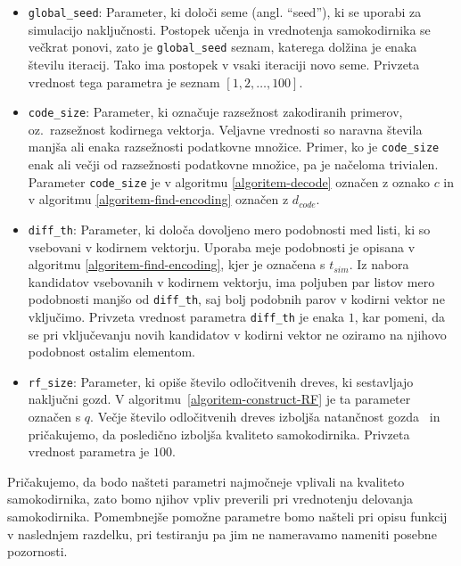 \documentclass[12pt,a4paper,twoside]{article}
\theoremstyle{definition} %
\theoremstyle{plain} %
\numberwithin{equation}{section}  %
\begin{document}
\begin{itemize}
	\item \texttt{global\_seed}: Parameter, ki določi seme (angl. ``seed''), ki se uporabi za simulacijo naključnosti.
	Postopek učenja in vrednotenja samokodirnika se večkrat ponovi, zato je \texttt{global\_seed} seznam, katerega dolžina je enaka številu iteracij.
	Tako ima postopek v vsaki iteraciji novo seme. 
	Privzeta vrednost tega parametra je seznam $[1,2,\ldots,100]$.

	\item \texttt{code\_size}: Parameter, ki označuje razsežnost zakodiranih primerov, oz.\ razsežnost kodirnega vektorja. 
	Veljavne vrednosti so naravna števila manjša ali enaka razsežnosti podatkovne množice.
	Primer, ko je \texttt{code\_size} enak ali večji od razsežnosti podatkovne množice, pa je načeloma trivialen.
	Parameter \texttt{code\_size} je v algoritmu \ref{algoritem-decode} označen z oznako $c$ in v algoritmu \ref{algoritem-find-encoding} označen z $d_{code}$. 
	
	\item \texttt{diff\_th}: Parameter, ki določa dovoljeno mero podobnosti med listi, ki so vsebovani v kodirnem vektorju.
	Uporaba meje podobnosti je opisana v algoritmu \ref{algoritem-find-encoding}, kjer je označena s $t_{\mathit{sim}}$.
	Iz nabora kandidatov vsebovanih v kodirnem vektorju, ima poljuben par listov mero podobnosti manjšo od \texttt{diff\_th}, saj bolj podobnih parov v kodirni vektor ne vključimo.
	Privzeta vrednost parametra \texttt{diff\_th} je enaka $1$, kar pomeni, da se pri vključevanju novih kandidatov v kodirni vektor ne oziramo na njihovo podobnost ostalim elementom. 

	\item \texttt{rf\_size}: Parameter, ki opiše število odločitvenih dreves, ki sestavljajo naključni gozd. 
	V algoritmu~\ref{algoritem-construct-RF} je ta parameter označen s $q$. 
	Večje število odločitvenih dreves izboljša natančnost gozda~\cite[str.\ 113]{louppe2015understanding} in pričakujemo, da posledično izboljša kvaliteto samokodirnika.
	Privzeta vrednost parametra je $100$.

\end{itemize}

Pričakujemo, da bodo našteti parametri najmočneje vplivali na kvaliteto samokodirnika, zato bomo njihov vpliv preverili pri vrednotenju delovanja samokodirnika. 
Pomembnejše pomožne parametre bomo našteli pri opisu funkcij v naslednjem razdelku, pri testiranju pa jim ne nameravamo nameniti posebne pozornosti.
\end{document}
